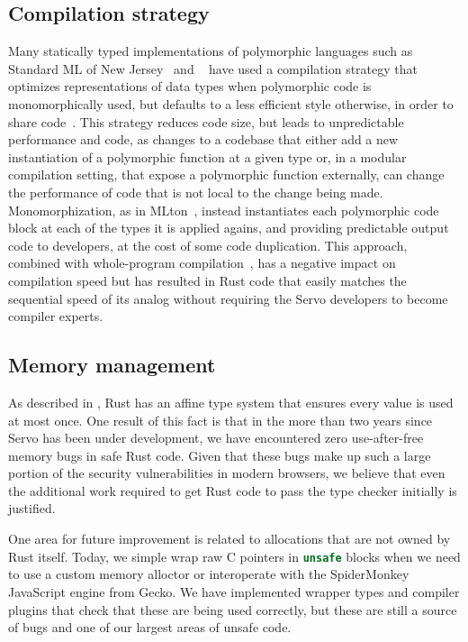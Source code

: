\subsection{Compilation strategy}
Many statically typed implementations of polymorphic languages such as Standard ML of New Jersey~\cite{SMLNJ} and
\ocaml{}~\cite{ocaml-manual-3.0} have used a compilation strategy that optimizes representations of data types when
polymorphic code is monomorphically used, but defaults to a less efficient style otherwise, in order to share
code~\cite{ocaml-repr}.
This strategy reduces code size, but leads to unpredictable performance and code, as changes to a codebase that
either add a new instantiation of a polymorphic function at a given type or, in a modular compilation setting, that
expose a polymorphic function externally, can change the performance of code that is not local to the change being
made.
Monomorphization, as in MLton~\cite{mlton-compiler}, instead instantiates each polymorphic code block at each of the types
it is applied agains, and providing predictable output code to developers, at the cost of some code duplication.
This approach, combined with whole-program compilation~\cite{weeks:whole-program-mlton}, has a negative impact on
compilation speed but has resulted in Rust code that easily matches the sequential speed of its \Cplusplus{} analog
without requiring the Servo developers to become compiler experts.

\subsection{Memory management}
As described in , Rust has an affine type system that ensures every value is used at
most once.
One result of this fact is that in the more than two years since Servo has been under development, we have
encountered zero use-after-free memory bugs in safe Rust code.
Given that these bugs make up such a large portion of the security vulnerabilities in modern browsers,
we believe that even the additional work required to get Rust code to pass the type checker initially is
justified.

One area for future improvement is related to allocations that are not owned by Rust itself.
Today, we simple wrap raw C pointers in \lstinline[language=Rust]{unsafe} blocks when we need to use a
custom memory alloctor or interoperate with the SpiderMonkey JavaScript engine from Gecko.
We have implemented wrapper types and compiler plugins that check that these are being used correctly,
but these are still a source of bugs and one of our largest areas of unsafe code.

